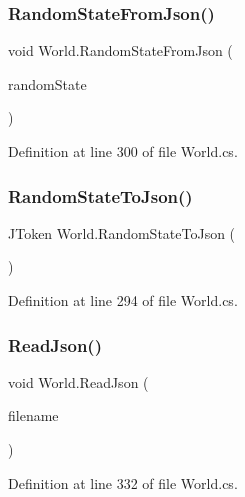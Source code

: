\subsubsection{\texorpdfstring{Random\+State\+From\+Json()}{RandomStateFromJson()}}
{\footnotesize\ttfamily void World.\+Random\+State\+From\+Json (\begin{DoxyParamCaption}\item[{J\+Token}]{random\+State }\end{DoxyParamCaption})}



Definition at line 300 of file World.\+cs.

\mbox{\label{class_world_a24c5ca21d6e92d0bd592b253adb44d7f}} 
\subsubsection{\texorpdfstring{Random\+State\+To\+Json()}{RandomStateToJson()}}
{\footnotesize\ttfamily J\+Token World.\+Random\+State\+To\+Json (\begin{DoxyParamCaption}{ }\end{DoxyParamCaption})}



Definition at line 294 of file World.\+cs.

\mbox{\label{class_world_a0a6b09300f49b33015e9599ffb66ce25}} 
\subsubsection{\texorpdfstring{Read\+Json()}{ReadJson()}\hspace{0.1cm}{\footnotesize\ttfamily [1/2]}}
{\footnotesize\ttfamily void World.\+Read\+Json (\begin{DoxyParamCaption}\item[{string}]{filename }\end{DoxyParamCaption})}



Definition at line 332 of file World.\+cs.

\mbox{\label{class_world_a5db684d7dbe14748304c6013c16356d6}} 
